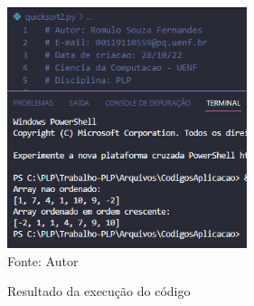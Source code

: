 	\begin{figure}[H]
		\begin{center}
			\caption{Resultado da execução do código} \label{ling1}
			\includegraphics[width=7cm]{quick.PNG} \\
			{\tiny \sf Fonte:{ Autor}}
		\end{center}
	\end{figure}
